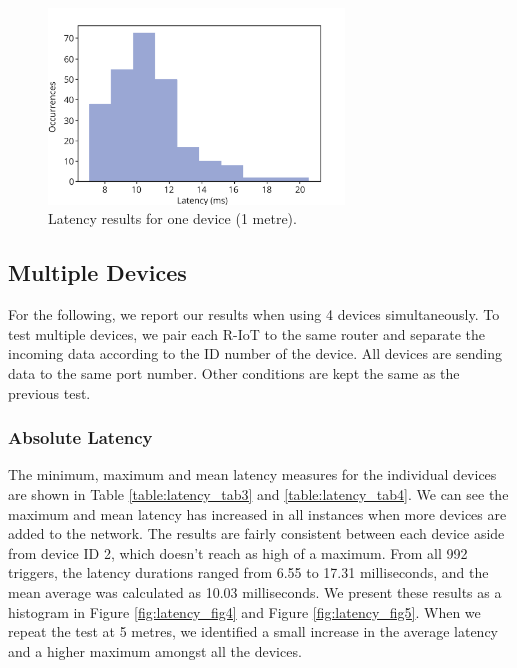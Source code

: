 \begin{figure}[htbp]
  \centering
    \includegraphics[width=0.7\textwidth]{Chapters/Figures/technical/Latency/figure3.png}
    \caption{Latency results for one device (1 metre).}
    \label{fig:latency_fig3}
\end{figure}

\subsection*{Multiple Devices}

For the following, we report our results when using 4 devices simultaneously. To test multiple devices, we pair each R-IoT to the same router and separate the incoming data according to the ID number of the device. All devices are sending data to the same port number. Other conditions are kept the same as the previous test.


\subsubsection*{Absolute Latency}
The minimum, maximum and mean latency measures for the individual devices are shown in Table \ref{table:latency_tab3} and \ref{table:latency_tab4}. We can see the maximum and mean latency has increased in all instances when more devices are added to the network. The results are fairly consistent between each device aside from device ID 2, which doesn’t reach as high of a maximum. From all 992 triggers, the latency durations ranged from 6.55 to 17.31 milliseconds, and the mean average was calculated as 10.03 milliseconds. We present these results as a histogram in Figure \ref{fig:latency_fig4} and Figure \ref{fig:latency_fig5}. When we repeat the test at 5 metres, we identified a small increase in the average latency and a higher maximum amongst all the devices.

